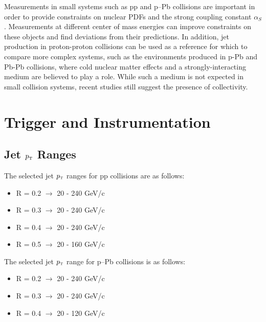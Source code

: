 \documentclass[ALICE]{ALICE_analysis_notes}
\newcommand{\pT}{$p_{\mbox{\tiny T}}$\xspace}
\newcommand{\pPb}{{\mbox{p--Pb}}\xspace}
\newcommand{\pp}{pp\xspace}
\begin{document}
Measurements in small systems such as pp and p--Pb collisions are important in order to provide constraints on nuclear PDFs and the strong coupling constant $\alpha_{S}$ \cite{CMSPDFConstraints}. Measurements at different center of mass energies can improve constraints on these objects and find deviations from their predictions. In addition, jet production in proton-proton collisions can be used as a reference for which to compare more complex systems, such as the environments produced in p-Pb and Pb-Pb collisions, where cold nuclear matter effects and a strongly-interacting medium are believed to play a role. While such a medium is not expected in small collision systems, recent studies still suggest the presence of collectivity.\clearpage{}
\clearpage{}\section{Trigger and Instrumentation}
\label{chap:TriggerAndInstrumentation}

\subsection{Jet \pT Ranges}
\label{sec:ptRanges}

The selected jet \pT ranges for \pp collisions are as follows:

\begin{itemize}
    \item R = 0.2 $\rightarrow$ 20 - 240 GeV/c
    \item R = 0.3 $\rightarrow$ 20 - 240 GeV/c
    \item R = 0.4 $\rightarrow$ 20 - 240 GeV/c
    \item R = 0.5 $\rightarrow$ 20 - 160 GeV/c
\end{itemize}

The selected jet \pT range for \pPb collisions is as follows:

\begin{itemize}
    \item R = 0.2 $\rightarrow$ 20 - 240 GeV/c
    \item R = 0.3 $\rightarrow$ 20 - 240 GeV/c
    \item R = 0.4 $\rightarrow$ 20 - 120 GeV/c
\end{itemize}
\end{document}
